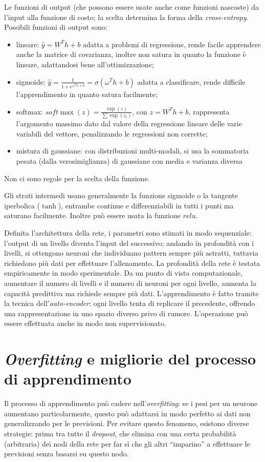 \documentclass[11pt, a4page]{article}
\begin{document}
Le funzioni di output (che possono essere usate anche come funzioni nascoste) da l'input alla funzione di costo; la scelta determina la forma della \textit{cross-entropy}.
Possibili funzioni di output sono:
\begin{itemize}[noitemsep]
\item lineare: $\hat{y} = W^Th + b$ adatta a problemi di regressione, rende facile apprendere anche la matrice di covarianza, inoltre non satura in quanto la funzione è lineare, adattandosi bene all'ottimizzazione;
\item sigmoide: $\hat{y} = \frac{1}{1 + e^{\omega^Th + b}} = \sigma(\omega^Th + b)$ adatta a classificare, rende difficile l'apprendimento in quanto satura facilmente;
\item softmax: $soft\max(z) = \frac{\exp(z)}{\sum \exp(z_i)}$, con $z = W^Th + b$, rappresenta l'argomento massimo dato dal valore della regressione lineare delle varie variabili del vettore, penalizzando le regressioni non corrette;
\item mistura di gaussiane: con distribuzioni multi-modali, si usa la sommatoria pesata (dalla verosimiglianza) di gaussiane con media e varianza diversa
\end{itemize}
Non ci sono regole per la scelta della funzione.

Gli strati intermedi usano generalmente la funzione sigmoide o la tangente iperbolica ($\tanh$), entrambe continue e differenziabili in tutti i punti ma saturano facilmente.
Inoltre può essere usata la funzione $relu$.

Definita l'architettura della rete, i parametri sono stimati in modo sequenziale: l'output di un livello diventa l'input del successivo; andando in profondità con i livelli, si ottengono neuroni che individuano pattern sempre più astratti, tuttavia richiedono più dati per effettuare l'allenamento.
La profondità della rete è testata empiricamente in modo sperimentale.
Da un punto di vista computazionale, aumentare il numero di livelli e il numero di neuroni per ogni livello, aumenta la capacità predittiva ma richiede sempre più dati.
L'apprendimento è fatto tramite la tecnica dell'\textit{auto-encoder}: ogni livello tenta di replicare il precedente, offrendo una rappresentazione in uno spazio diverso privo di rumore.
L'operazione può essere effettuata anche in modo non supervisionato.

\section{\textit{Overfitting} e migliorie del processo di apprendimento}
Il processo di apprendimento può cadere nell'\textit{overfitting}: se i pesi per un neurone aumentano particolarmente, questo può adattarsi in modo perfetto ai dati non generalizzando per le previsioni.
Per evitare questo fenomeno, esistono diverse strategie: prima tra tutte il \textit{dropout}, che elimina con una certa probabilità (arbitraria) dei nodi della rete per far sì che gli altri ``imparino'' a effettuare le previsioni senza basarsi su questo nodo.
\end{document}
